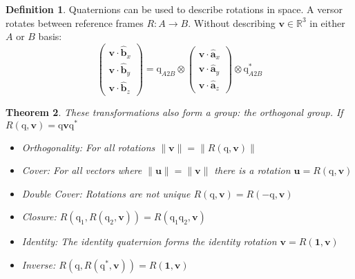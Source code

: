 \documentclass{amsart}
\newtheorem{theorem}{Theorem}[section]
\theoremstyle{definition}
\newtheorem{definition}[theorem]{Definition}
\theoremstyle{remark}
\numberwithin{equation}{section}
\begin{document}
\begin{definition}
  Quaternions can be used to describe rotations in space. A versor rotates between reference frames $R:A\to B$. Without describing $\mathbf{v}\in\mathbb{R}^3$ in either $A$ or $B$ basis:
  \begin{equation}
    \begin{pmatrix}
      \mathbf{v} \cdot \mathbf{\hat{b}}_x \\
      \mathbf{v} \cdot \mathbf{\hat{b}}_y \\
      \mathbf{v} \cdot \mathbf{\hat{b}}_z
    \end{pmatrix}
    = \mathrm{q}_{A2B} \otimes
    \begin{pmatrix}
      \mathbf{v} \cdot \mathbf{\hat{a}}_x \\
      \mathbf{v} \cdot \mathbf{\hat{a}}_y \\
      \mathbf{v} \cdot \mathbf{\hat{a}}_z
    \end{pmatrix}
    \otimes \mathrm{q}_{A2B}^*
  \end{equation}
\end{definition}

\begin{theorem}
  These transformations also form a group: the orthogonal group. If $R(\mathrm{q}, \mathbf{v})=\mathrm{q}\mathbf{v}\mathrm{q}^*$
  \begin{itemize}
  \item Orthogonality: For all rotations $\|\mathbf{v}\|=\|R(\mathrm{q}, \mathbf{v})\|$
  \item Cover: For all vectors where $\|\mathbf{u}\|=\|\mathbf{v}\|$ there is a rotation $\mathbf{u}=R(\mathrm{q}, \mathbf{v})$
  \item Double Cover: Rotations are not unique $R(\mathrm{q},\mathbf{v})=R(-\mathrm{q},\mathbf{v})$
  \item Closure: $R(\mathrm{q}_1, R(\mathrm{q}_2, \mathbf{v})) = R(\mathrm{q}_1\mathrm{q}_2, \mathbf{v})$
  \item Identity: The identity quaternion forms the identity rotation $\mathbf{v} = R(\mathbf{1}, \mathbf{v})$
  \item Inverse: $R(\mathrm{q}, R(\mathrm{q}^*, \mathbf{v})) = R(\mathbf{1}, \mathbf{v})$
  \end{itemize}
\end{theorem}
\end{document}
